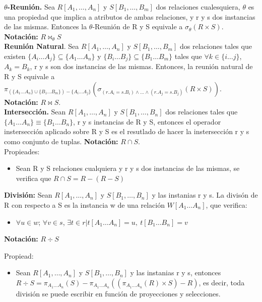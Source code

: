 \documentclass[a4paper,11pt]{article}
\begin{document}
\textbf{$\theta$-Reunión.} Sea $R[A_1,\ldots,A_n]$ y $S[B_1,\ldots,B_m]$ dos relaciones cualesquiera, $\theta$ es una propiedad que implica a atributos de ambas relaciones, y r y s dos instancias de las mismas. Entonces la $\theta$-Reunión de R y S equivale a $\sigma_\theta(R\times S)$. \textbf{Notación:} $R \Join_\theta S$ \\

\textbf{Reunión Natural}. Sea $R[A_1,\ldots,A_n]$ y $S[B_1,\ldots,B_m]$ dos relaciones tales que existen $\{A_i\ldots A_j\} \subseteq \{A_1\ldots A_n\}$ y $\{B_i\ldots B_j\}\subseteq \{B_1\ldots B_m\}$ tales que $\forall k \in \{i\ldots j\}$, $A_k = B_k$, r y s son dos instancias de las mismas. Entonces, la reunión natural de R y S equivale a $\pi_{(\{A_1\ldots A_n\}\cup\{B_1\ldots B_m\})-\{A_i\ldots A_j\}}(\sigma_{(r.A_i=s.B_i)\land\ldots\land(r.A_j=s.B_j)}(R\times S))$. \textbf{Notación:} $R\Join S$. \\

\textbf{Intersección.} Sean $R[A_1,\ldots,A_n]$ y $S[B_1,\ldots,B_n]$ dos relaciones tales que $\{A_1\ldots A_n\}\equiv\{B_1\ldots B_n\}$, r y s  instancias de R y S, entonces el operador instersección aplicado sobre R y S es el resutlado de hacer la instersección r y s como conjunto de tuplas. \textbf{Notación:} $R \cap S$. \\

Propieades:
\begin{itemize}
\item Sean R y S relaciones cualquiera y r y s dos instancias de las mismas, se verifica que $R \cap S=R-(R-S)$
\end{itemize}

\textbf{División:} Sean $R[A_1,\ldots,A_n]$ y $S[B_1,\ldots,B_n]$ y las instanias r y s. La divisón de R con respecto a S es la instancia w de una relación $W[A_1\ldots A_n]$, que verifica:

\begin{itemize}
\item $\forall u \in w$; $\forall v \in s$, $\exists t \in r|t[A_1\ldots A_n]=u,\> t[B_1\ldots B_n]=v$
\end{itemize}

\textbf{Notación:} $R \div S$ 

Propiead:

\begin{itemize}
\item Sean $R[A_1,\ldots,A_n]$ y $S[B_1,\ldots,B_n]$ y las instanias r y s, entonces $R \div S=\pi_{A_1\ldots A_n}(S)-\pi_{A_1\ldots A_n}((\pi_{A_1\ldots A_n}(R)\times S)-R)$, es decir, toda división se puede escribir en función de proyecciones y selecciones.
\end{itemize}
\end{document}

